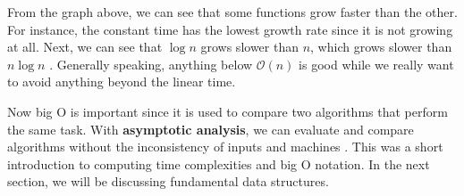 \documentclass[../../../main.tex]{subfiles}
\begin{document}
From the graph above, we can see that some functions grow faster
than the other. For instance, the constant time has the lowest
growth rate since it is not growing at all. Next, we can see
that $\log{n}$ grows slower than $n$, which grows slower than
$n \log{n}$ \cite{CS02-5}. Generally speaking, anything below
$\mathcal{O}(n)$ is good while we really want to avoid anything
beyond the linear time.

Now big O is important since it is used to compare two algorithms
that perform the same task. With \textbf{asymptotic analysis},
we can evaluate and compare algorithms without the inconsistency
of inputs and machines \cite{CS02-5}. This was a short introduction
to computing time complexities and big O notation. In the next
section, we will be discussing fundamental data structures.
\end{document}
